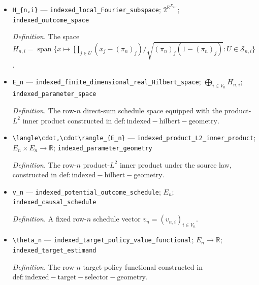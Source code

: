 \documentclass{article}
\begin{document}
\begin{itemize}
  \par\smallskip\noindent\emph{Definition.} Local assignment cells \(X_{n,i}=\{0,1\}^{\Gamma_{n,i}}\) in row \(n\).
  \item \texttt{H\_\allowbreak{}\{n,\allowbreak{}i\}\allowbreak{}} --- \texttt{indexed\_\allowbreak{}local\_\allowbreak{}Fourier\_\allowbreak{}subspace}; \(2^{\mathbb R^{X_{n,i}}}\); \texttt{indexed\_\allowbreak{}outcome\_\allowbreak{}space}
  \par\smallskip\noindent\emph{Definition.} The space \(H_{n,i}=\operatorname{span}\{x\mapsto\prod_{j\in U}(x_j-(\pi_n)_j)/\sqrt{(\pi_n)_j(1-(\pi_n)_j)}:U\in\mathcal S_{n,i}\}\).
  \item \texttt{E\_\allowbreak{}n} --- \texttt{indexed\_\allowbreak{}finite\_\allowbreak{}dimensional\_\allowbreak{}real\_\allowbreak{}Hilbert\_\allowbreak{}space}; \(\bigoplus_{i\in V_n}H_{n,i}\); \texttt{indexed\_\allowbreak{}parameter\_\allowbreak{}space}
  \par\smallskip\noindent\emph{Definition.} The row-\(n\) direct-sum schedule space equipped with the product-\(L^2\) inner product constructed in \(\mathrm{def:indexed-hilbert-geometry}\).
  \item \texttt{\textbackslash{}\allowbreak{}langle\textbackslash{}\allowbreak{}cdot,\allowbreak{}\textbackslash{}\allowbreak{}cdot\textbackslash{}\allowbreak{}rangle\_\allowbreak{}\{E\_\allowbreak{}n\}\allowbreak{}} --- \texttt{indexed\_\allowbreak{}product\_\allowbreak{}L2\_\allowbreak{}inner\_\allowbreak{}product}; \(E_n\times E_n\to\mathbb R\); \texttt{indexed\_\allowbreak{}parameter\_\allowbreak{}geometry}
  \par\smallskip\noindent\emph{Definition.} The row-\(n\) product-\(L^2\) inner product under the source law, constructed in \(\mathrm{def:indexed-hilbert-geometry}\).
  \item \texttt{v\_\allowbreak{}n} --- \texttt{indexed\_\allowbreak{}potential\_\allowbreak{}outcome\_\allowbreak{}schedule}; \(E_n\); \texttt{indexed\_\allowbreak{}causal\_\allowbreak{}schedule}
  \par\smallskip\noindent\emph{Definition.} A fixed row-\(n\) schedule vector \(v_n=(v_{n,i})_{i\in V_n}\).
  \item \texttt{\textbackslash{}\allowbreak{}theta\_\allowbreak{}n} --- \texttt{indexed\_\allowbreak{}target\_\allowbreak{}policy\_\allowbreak{}value\_\allowbreak{}functional}; \(E_n\to\mathbb R\); \texttt{indexed\_\allowbreak{}target\_\allowbreak{}estimand}
  \par\smallskip\noindent\emph{Definition.} The row-\(n\) target-policy functional constructed in \(\mathrm{def:indexed-target-selector-geometry}\).

\end{itemize}
\end{document}
